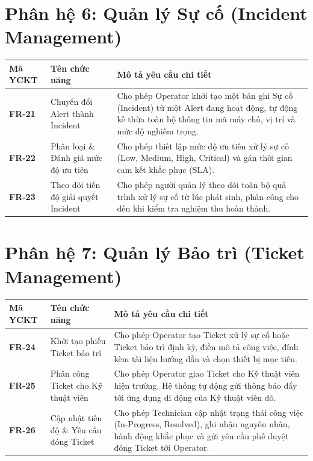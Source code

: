 \section{Phân hệ 6: Quản lý Sự cố (Incident Management)}
\begin{longtable}{|p{2.5cm}|p{4cm}|p{8cm}|}
\hline
\textbf{Mã YCKT} & \textbf{Tên chức năng} & \textbf{Mô tả yêu cầu chi tiết} \\ \hline
\endhead
\textbf{FR-21} & Chuyển đổi Alert thành Incident & Cho phép Operator khởi tạo một bản ghi Sự cố (Incident) từ một Alert đang hoạt động, tự động kế thừa toàn bộ thông tin mã máy chủ, vị trí và mức độ nghiêm trọng. \\ \hline
\textbf{FR-22} & Phân loại \& Đánh giá mức độ ưu tiên & Cho phép thiết lập mức độ ưu tiên xử lý sự cố (Low, Medium, High, Critical) và gán thời gian cam kết khắc phục (SLA). \\ \hline
\textbf{FR-23} & Theo dõi tiến độ giải quyết Incident & Cho phép người quản lý theo dõi toàn bộ quá trình xử lý sự cố từ lúc phát sinh, phân công cho đến khi kiểm tra nghiệm thu hoàn thành. \\ \hline
\end{longtable}

\section{Phân hệ 7: Quản lý Bảo trì (Ticket Management)}
\begin{longtable}{|p{2.5cm}|p{4cm}|p{8cm}|}
\hline
\textbf{Mã YCKT} & \textbf{Tên chức năng} & \textbf{Mô tả yêu cầu chi tiết} \\ \hline
\endhead
\textbf{FR-24} & Khởi tạo phiếu Ticket bảo trì & Cho phép Operator tạo Ticket xử lý sự cố hoặc Ticket bảo trì định kỳ, điền mô tả công việc, đính kèm tài liệu hướng dẫn và chọn thiết bị mục tiêu. \\ \hline
\textbf{FR-25} & Phân công Ticket cho Kỹ thuật viên & Cho phép Operator giao Ticket cho Kỹ thuật viên hiện trường. Hệ thống tự động gửi thông báo đẩy tới ứng dụng di động của Kỹ thuật viên đó. \\ \hline
\textbf{FR-26} & Cập nhật tiến độ \& Yêu cầu đóng Ticket & Cho phép Technician cập nhật trạng thái công việc (In-Progress, Resolved), ghi nhận nguyên nhân, hành động khắc phục và gửi yêu cầu phê duyệt đóng Ticket tới Operator. \\ \hline
\end{longtable}

